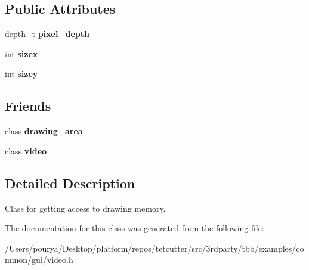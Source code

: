 \subsection*{Public Attributes}
\begin{DoxyCompactItemize}
\item 
\hypertarget{classdrawing__memory_a5b3b95f96747482ca11cfc30500469ba}{}depth\+\_\+t {\bfseries pixel\+\_\+depth}\label{classdrawing__memory_a5b3b95f96747482ca11cfc30500469ba}

\item 
\hypertarget{classdrawing__memory_a9007f60a0137ba4dec754f4ca10ae4a4}{}int {\bfseries sizex}\label{classdrawing__memory_a9007f60a0137ba4dec754f4ca10ae4a4}

\item 
\hypertarget{classdrawing__memory_a78aff4c5aff21d1ddbfa5851a0f1ff47}{}int {\bfseries sizey}\label{classdrawing__memory_a78aff4c5aff21d1ddbfa5851a0f1ff47}

\end{DoxyCompactItemize}
\subsection*{Friends}
\begin{DoxyCompactItemize}
\item 
\hypertarget{classdrawing__memory_a8311890bac6c800f7717acd6ea18a39d}{}class {\bfseries drawing\+\_\+area}\label{classdrawing__memory_a8311890bac6c800f7717acd6ea18a39d}

\item 
\hypertarget{classdrawing__memory_a012c3ec554ae6f1a9cdfaa2281c40c4d}{}class {\bfseries video}\label{classdrawing__memory_a012c3ec554ae6f1a9cdfaa2281c40c4d}

\end{DoxyCompactItemize}


\subsection{Detailed Description}
Class for getting access to drawing memory. 

The documentation for this class was generated from the following file\+:\begin{DoxyCompactItemize}
\item 
/\+Users/pourya/\+Desktop/platform/repos/tetcutter/src/3rdparty/tbb/examples/common/gui/video.\+h\end{DoxyCompactItemize}
